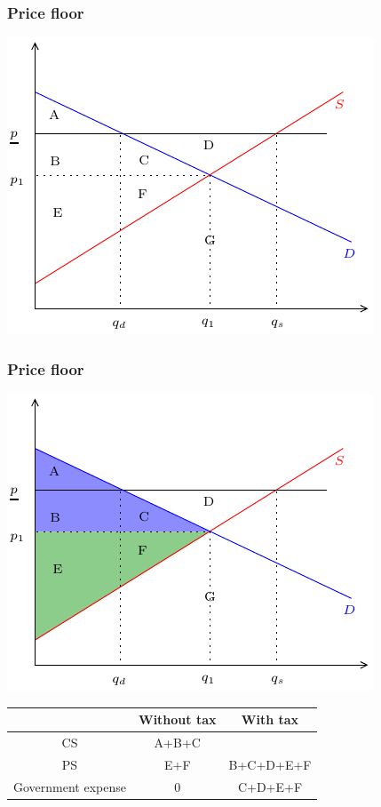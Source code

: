 \documentclass[xcolor=pdftex,dvipsnames]{beamer}
\begin{document}
\begin{frame}
\frametitle{Price floor}
\begin{center}
\includegraphics{pics/PriceFloor}
\end{center}
\vspace{0.8in}
\end{frame}

\begin{frame}
\frametitle{Price floor}
\begin{center}
\includegraphics{pics/PriceFloorA}

\begin{tabular}{|c|c|c|}\hline &Without tax & With tax\\
\hline CS & A+B+C & \\
\hline PS & E+F &  {\color{white}B+C+D+E+F}\\
\hline Government expense& 0 & {\color{white}C+D+E+F}
\\
\hline
\end{tabular}
\end{center}
\end{frame}
\end{document}
